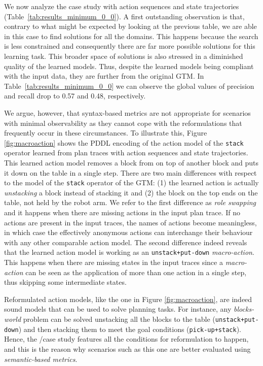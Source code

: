 We now analyze the case study with \NO action sequences and \NO state trajectories (Table~\ref{tab:results_minimum_0_0}). A first outstanding observation is that, contrary to what might be expected by looking at the previous table, we are able in this case to find solutions for all the domains. This happens because the search is less constrained and consequently there are far more possible solutions for this learning task. This broader space of solutions is also stressed in a diminished quality of the learned models. Thus, despite the learned models being compliant with the input data, they are further from the original GTM. In Table~\ref{tab:results_minimum_0_0} we can observe the global values of precision and recall drop to 0.57 and 0.48, respectively.

We argue, however, that syntax-based metrics are not appropriate for scenarios with minimal observability as they cannot cope with the reformulations that frequently occur in these circumstances. To illustrate this, Figure \ref{fig:macroaction} shows the PDDL encoding of the action model of the {\tt\small stack} operator learned from plan traces with \NO action sequences and \NO state trajectories. This learned action model removes a block from on top of another block and puts it down on the table in a single step. There are two main differences with respect to the model of the {\tt\small stack} operator of the GTM: (1) the learned action is actually \emph{unstacking} a block instead of stacking it and (2) the block on the top ends on the table, not held by the robot arm. We refer to the first difference as \emph{role swapping} and it happens when there are missing actions in the input plan trace. If no actions are present in the input traces, the names of actions become meaningless, in which case the effectively anonymous actions can interchange their behaviour with any other comparable action model. The second difference indeed reveals that the learned action model is working as an {\tt\small unstack+put-down} \emph{macro-action}. This happens when there are missing states in the input traces since a \emph{macro-action} can be seen as the application of more than one action in a single step, thus skipping some intermediate states.

Reformulated action models, like the one in Figure \ref{fig:macroaction}, are indeed sound models that can be used to solve planning tasks. For instance, any \emph{blocks-world} problem can be solved unstacking all the blocks to the table ({\tt\small unstack+put-down}) and then stacking them to meet the goal conditions ({\tt\small pick-up+stack}). Hence, the \NO/\NO case study features all the conditions for reformulation to happen, and this is the reason why scenarios such as this one are better evaluated using {\em semantic-based metrics}.


